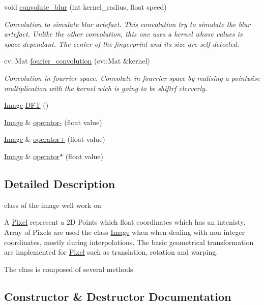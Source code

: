 \begin{DoxyCompactItemize}
void \hyperlink{class_image_aba2973253b0bad7456c5434589cd79d3}{convolute\+\_\+blur} (int kernel\+\_\+radius, float speed)
\begin{DoxyCompactList}\small\item\em Convolution to simulate blur artefact. This convolution try to simulate the blur artefact. Unlike the other convolution, this one uses a kernel whose values is space dependant. The center of the fingerprint and its size are self-\/detected. \end{DoxyCompactList}\item 
cv\+::\+Mat \hyperlink{class_image_a2a9c42c15f6d5c6ecf6bc921169b9579}{fourier\+\_\+convolution} (cv\+::\+Mat \&kernel)
\begin{DoxyCompactList}\small\item\em Convolution in fourrier space. Convolute in fourrier space by realising a pointwise multiplication with the kernel wich is going to be shiftrf clerverly. \end{DoxyCompactList}\item 
\hyperlink{class_image}{Image} \hyperlink{class_image_aca2af304b9c00397cc4af4683f73cbaf}{D\+FT} ()
\item 
\hyperlink{class_image}{Image} \& \hyperlink{class_image_ac597aa24bd31b8564401e47a4f017a2c}{operator-\/} (float value)
\item 
\hyperlink{class_image}{Image} \& \hyperlink{class_image_a05c50340ea69a63d17885753cf553f4a}{operator+} (float value)
\item 
\hyperlink{class_image}{Image} \& \hyperlink{class_image_afbb87a31a42d42c876fb6dcd532b0ba6}{operator$\ast$} (float value)
\end{DoxyCompactItemize}


\subsection{Detailed Description}
class of the image we\textquotesingle{}ll work on 

A \hyperlink{class_pixel}{Pixel} represent a 2D Points which float coordinates which has an intenisty. Array of Pixels are used the class \hyperlink{class_image}{Image} when when dealing with non integer coordinates, mostly during interpolations. The basic geometrical transformation are implemented for \hyperlink{class_pixel}{Pixel} such as translation, rotation and warping.

The class is composed of several methods 

\subsection{Constructor \& Destructor Documentation}
\mbox{\label{class_image_ae39428477b96676d7a6eb0c1778a44e9}} 
